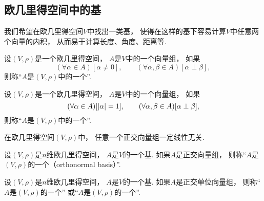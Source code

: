 \subsection{欧几里得空间中的基}
我们希望在欧几里得空间\(V\)中找出一类基，
使得在这样的基下容易计算\(V\)中任意两个向量的内积，
从而易于计算长度、角度、距离等.

\begin{definition}
设\((V,\rho)\)是一个欧几里得空间，
\(A\)是\(V\)中的一个向量组，
如果\begin{equation*}
	(\forall \alpha \in A)
	[\alpha\neq0],
	\qquad
	(\forall \alpha,\beta \in A)
	[\alpha \perp \beta],
\end{equation*}
则称“\(A\)是\((V,\rho)\)中的一个”.
\end{definition}

\begin{definition}
设\((V,\rho)\)是一个欧几里得空间，
\(A\)是\(V\)中的一个向量组，
如果\begin{equation*}
	(\forall \alpha \in A)
	[\abs{\alpha} = 1],
	\qquad
	(\forall \alpha,\beta \in A)
	[\alpha \perp \beta],
\end{equation*}
则称“\(A\)是\((V,\rho)\)中的一个”.
\end{definition}

\begin{proposition}
在欧几里得空间\((V,\rho)\)中，
任意一个正交向量组一定线性无关.
\end{proposition}

\begin{definition}
设\((V,\rho)\)是\(n\)维欧几里得空间，
\(A\)是\(V\)的一个基.
如果\(A\)是正交向量组，
则称“\(A\)是\((V,\rho)\)的一个（orthonormal basis）”.
\end{definition}

\begin{definition}
设\((V,\rho)\)是\(n\)维欧几里得空间，
\(A\)是\(V\)的一个基.
如果\(A\)是正交单位向量组，
则称“\(A\)是\((V,\rho)\)的一个”
或“\(A\)是\((V,\rho)\)的一个”.
\end{definition}

